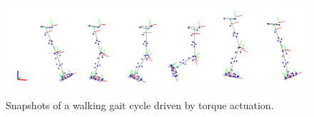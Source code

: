 \begin{figure}[t!]
\centering
\includegraphics[width=\textwidth]{figures/multiphase_walking_cycle.png}\\
\caption{Snapshots of a walking gait cycle driven by torque actuation.}
\label{fig:snapshots_multiphase_walking_cycle}
\end{figure}


